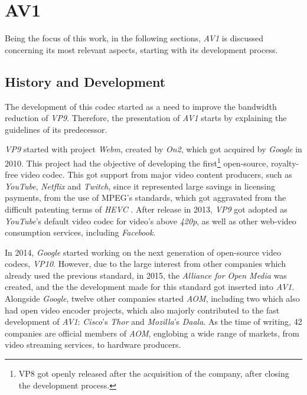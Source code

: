 \nocite{agostiniDesenvolvimentoArquiteturasAlto2007}

\section{AV1}

Being the focus of this work, in the following sections, \emph{AV1} is discussed concerning its most relevant aspects, starting with its development process.

\subsection{History and Development}

\nocite{debarghamukherjeeAllThingsRTC2019Opening2019}

The development of this codec started as a need to improve the bandwidth reduction of \emph{VP9}. Therefore, the presentation of \emph{AV1} starts by explaining the guidelines of its predecessor.

\emph{VP9} started with project \emph{Webm}, created by \emph{On2}, which got acquired by \emph{Google} in 2010. This project had the objective of developing the first\footnote{VP8 got openly released after the acquisition of the company, after closing the development process.} open-source, royalty-free video codec. This got support from major video content producers, such as \emph{YouTube}, \emph{Netflix} and \emph{Twitch}, since it represented large savings in licensing payments, from the use of MPEG's standards, which got aggravated from the difficult patenting terms of \emph{HEVC} \cite{streamingmediaHEVCAdvancePatent2015}. After release in 2013, \emph{VP9} got adopted as \emph{YouTube}'s default video codec for video's above \emph{420p}, as well as other web-video consumption services, including \emph{Facebook}.

In 2014, \emph{Google} started working on the next generation of open-source video codecs, \emph{VP10}. However, due to the large interest from other companies which already used the previous standard, in 2015, the \emph{Alliance for Open Media} was created, and the the development made for this standard got inserted into \emph{AV1}. Alongside \emph{Google}, twelve other companies started \emph{AOM}, including two which also had open video encoder projects, which also majorly contributed to the fast development of \emph{AV1}: \emph{Cisco}'s \emph{Thor} and \emph{Mozilla}'s \emph{Daala}. As the time of writing, 42 companies are official members of \emph{AOM}, englobing a wide range of markets, from video streaming services, to hardware producers.

